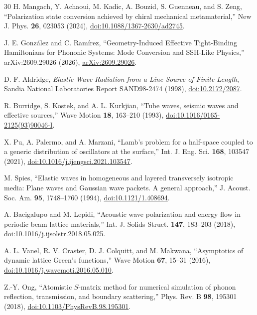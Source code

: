 \documentclass[10pt,aps,onecolumn,floatfix,notitlepage,nofootinbib,showkeys]{revtex4-2}
\begin{document}
\begin{thebibliography}{30}
H. Mangach, Y. Achaoui, M. Kadic, A. Bouzid, S. Guenneau, and S. Zeng,
``Polarization state conversion achieved by chiral mechanical metamaterial,''
New J. Phys. \textbf{26}, 023053 (2024),
\href{https://doi.org/10.1088/1367-2630/ad2745}{doi:10.1088/1367-2630/ad2745}.

J. E. Gonz\'alez and C. Ram\'irez,
``Geometry-Induced Effective Tight-Binding Hamiltonians for Phononic Systems: Mode Conversion and SSH-Like Physics,''
arXiv:2609.29026 (2026),
\href{https://arxiv.org/abs/2609.29026}{arXiv:2609.29026}.

D. F. Aldridge,
\textit{Elastic Wave Radiation from a Line Source of Finite Length},
Sandia National Laboratories Report SAND98-2474 (1998),
\href{https://doi.org/10.2172/2087}{doi:10.2172/2087}.

R. Burridge, S. Kostek, and A. L. Kurkjian,
``Tube waves, seismic waves and effective sources,''
Wave Motion \textbf{18}, 163--210 (1993),
\href{https://doi.org/10.1016/0165-2125(93)90046-I}{doi:10.1016/0165-2125(93)90046-I}.

X. Pu, A. Palermo, and A. Marzani,
``Lamb's problem for a half-space coupled to a generic distribution of oscillators at the surface,''
Int. J. Eng. Sci. \textbf{168}, 103547 (2021),
\href{https://doi.org/10.1016/j.ijengsci.2021.103547}{doi:10.1016/j.ijengsci.2021.103547}.

M. Spies,
``Elastic waves in homogeneous and layered transversely isotropic media: Plane waves and Gaussian wave packets. A general approach,''
J. Acoust. Soc. Am. \textbf{95}, 1748--1760 (1994),
\href{https://doi.org/10.1121/1.408694}{doi:10.1121/1.408694}.

A. Bacigalupo and M. Lepidi,
``Acoustic wave polarization and energy flow in periodic beam lattice materials,''
Int. J. Solids Struct. \textbf{147}, 183--203 (2018),
\href{https://doi.org/10.1016/j.ijsolstr.2018.05.025}{doi:10.1016/j.ijsolstr.2018.05.025}.

A. L. Vanel, R. V. Craster, D. J. Colquitt, and M. Makwana,
``Asymptotics of dynamic lattice Green's functions,''
Wave Motion \textbf{67}, 15--31 (2016),
\href{https://doi.org/10.1016/j.wavemoti.2016.05.010}{doi:10.1016/j.wavemoti.2016.05.010}.

Z.-Y. Ong,
``Atomistic $S$-matrix method for numerical simulation of phonon reflection, transmission, and boundary scattering,''
Phys. Rev. B \textbf{98}, 195301 (2018),
\href{https://doi.org/10.1103/PhysRevB.98.195301}{doi:10.1103/PhysRevB.98.195301}.


\end{thebibliography}
\end{document}
